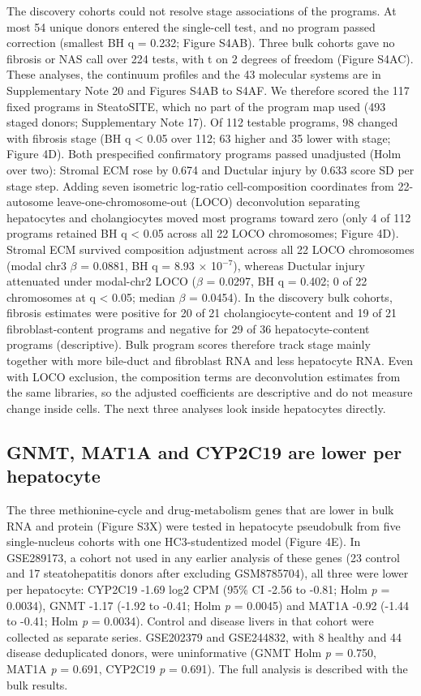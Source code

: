 The discovery cohorts could not resolve stage associations of the programs. At most 54 unique donors entered the single-cell test, and no program passed correction (smallest BH q = 0.232; Figure S4AB). Three bulk cohorts gave no fibrosis or NAS call over 224 tests, with t on 2 degrees of freedom (Figure S4AC). These analyses, the continuum profiles and the 43 molecular systems are in Supplementary Note 20 and Figures S4AB to S4AF. We therefore scored the 117 fixed programs in SteatoSITE, which no part of the program map used (493 staged donors; Supplementary Note 17). Of 112 testable programs, 98 changed with fibrosis stage (BH q \textless{} 0.05 over 112; 63 higher and 35 lower with stage; Figure 4D). Both prespecified confirmatory programs passed unadjusted (Holm over two): Stromal ECM rose by 0.674 and Ductular injury by 0.633 score SD per stage step. Adding seven isometric log-ratio cell-composition coordinates from 22-autosome leave-one-chromosome-out (LOCO) deconvolution separating hepatocytes and cholangiocytes moved most programs toward zero (only 4 of 112 programs retained BH q \textless{} 0.05 across all 22 LOCO chromosomes; Figure 4D). Stromal ECM survived composition adjustment across all 22 LOCO chromosomes (modal chr3 $\beta$ = 0.0881, BH q = 8.93 $\times$ 10$^{-7}$), whereas Ductular injury attenuated under modal-chr2 LOCO ($\beta$ = 0.0297, BH q = 0.402; 0 of 22 chromosomes at q \textless{} 0.05; median $\beta$ = 0.0454). In the discovery bulk cohorts, fibrosis estimates were positive for 20 of 21 cholangiocyte-content and 19 of 21 fibroblast-content programs and negative for 29 of 36 hepatocyte-content programs (descriptive). Bulk program scores therefore track stage mainly together with more bile-duct and fibroblast RNA and less hepatocyte RNA. Even with LOCO exclusion, the composition terms are deconvolution estimates from the same libraries, so the adjusted coefficients are descriptive and do not measure change inside cells. The next three analyses look inside hepatocytes directly.

\subsection{GNMT, MAT1A and CYP2C19 are lower per hepatocyte}\label{gnmt-mat1a-and-cyp2c19-are-lower-per-hepatocyte}

The three methionine-cycle and drug-metabolism genes that are lower in bulk RNA and protein (Figure S3X) were tested in hepatocyte pseudobulk from five single-nucleus cohorts with one HC3-studentized model (Figure 4E). In GSE289173, a cohort not used in any earlier analysis of these genes (23 control and 17 steatohepatitis donors after excluding GSM8785704), all three were lower per hepatocyte: CYP2C19 -1.69 log2 CPM (95\% CI -2.56 to -0.81; Holm \emph{p} = 0.0034), GNMT -1.17 (-1.92 to -0.41; Holm \emph{p} = 0.0045) and MAT1A -0.92 (-1.44 to -0.41; Holm \emph{p} = 0.0034). Control and disease livers in that cohort were collected as separate series. GSE202379 and GSE244832, with 8 healthy and 44 disease deduplicated donors, were uninformative (GNMT Holm \emph{p} = 0.750, MAT1A \emph{p} = 0.691, CYP2C19 \emph{p} = 0.691). The full analysis is described with the bulk results.

